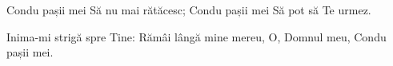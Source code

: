 \beginverse
Condu pașii mei
Să nu mai rătăcesc;
Condu pașii mei
Să pot să Te urmez.
\endverse

\beginchorus
Inima-mi strigă spre Tine:
Rămâi lângă mine mereu,
O, Domnul meu,
Condu pașii mei.
\endchorus
\endsong
